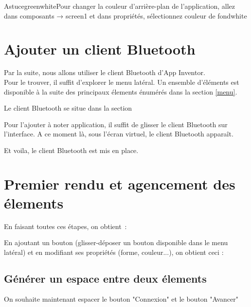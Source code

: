 \begin{messageBox}{Astuce}{green}{white}{Pour changer la couleur d'arrière-plan de l'application, allez dans composants → screen1 et dans propriétés, sélectionnez couleur de fond}{white}
\end{messageBox}

\section{Ajouter un client Bluetooth} \label{bluetooth_install}

Par la suite, nous allons utiliser le client Bluetooth d'App Inventor. \\
Pour le trouver, il suffit d'explorer le {\color{orange}menu latéral}. Un ensemble d'éléments est disponible à la suite des principaux élements énumérés dans la section \ref{menu}.


Le client Bluetooth se situe dans la section 

Pour l'ajouter à noter application, il suffit de glisser le client Bluetooth sur l'{\color{blue}interface}.
A ce moment là, sous l'écran virtuel, le client Bluetooth apparaît.


Et voila, le client Bluetooth est mis en place.

\section{Premier rendu et agencement des élements}

En faisant toutes ces étapes, on obtient : 


En ajoutant un bouton (glisser-déposer un bouton disponible dans le menu latéral) et en modifiant ses propriétés (forme, couleur...), on obtient ceci : 


\subsection{Générer un espace entre deux élements}

On souhaite maintenant espacer le bouton "Connexion" et le bouton "Avancer" \\

